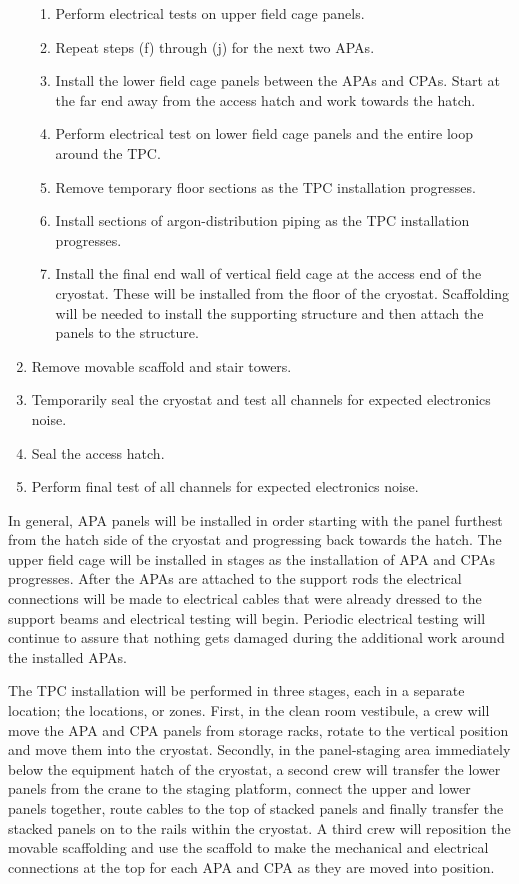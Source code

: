 \begin{enumerate}
\begin{enumerate}
   \item Perform electrical tests on upper field cage panels.
   \item Repeat steps (f) through (j) for the next two APAs.
   \item Install the lower field cage panels between the APAs and CPAs.  Start at the far end away from the access hatch and work towards the hatch. 
   \item Perform electrical test on lower field cage panels and the entire loop around the TPC.
   \item Remove temporary floor sections as the TPC installation progresses.
   \item Install sections of argon-distribution piping as the TPC installation progresses.
   \item Install the final end wall of vertical field cage at the access end of the cryostat.  These will be installed from the floor of the cryostat.  Scaffolding will be needed to install the supporting structure and then attach the panels to the structure.
   \end{enumerate}
\item Remove movable scaffold and stair towers.
\item Temporarily seal the cryostat and test all channels for expected electronics noise.
\item Seal the access hatch.
\item Perform final test of all channels for expected electronics noise.
\end{enumerate}
 
In general, APA panels will be installed in order starting with the panel furthest from the hatch side of the cryostat and progressing back towards the hatch. The upper field cage will be installed in stages as the installation of APA and CPAs progresses.  After the APAs are attached to the support rods the electrical connections will be made to electrical cables that were already dressed to the support beams and electrical testing will begin. Periodic electrical testing will continue to assure that nothing gets  damaged during the additional work around the installed APAs.  

The TPC installation will be performed in three stages, each in a separate location; the locations, or 
zones. First, in the clean room vestibule, a crew will move the APA and CPA panels from storage racks, rotate to the vertical position and move them into the cryostat. Secondly, in the panel-staging area immediately below the equipment hatch of the cryostat, a second crew will transfer the lower panels from the crane to the staging platform, connect the upper and lower panels together, route cables to the top of stacked panels and finally transfer the stacked panels on to the rails within the cryostat. A third crew will reposition the movable scaffolding and use the scaffold to make the mechanical and electrical  connections at the top for each APA and CPA as they are moved into position.  

